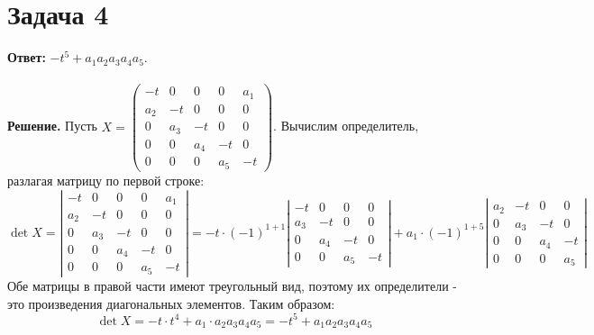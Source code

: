 \documentclass{article}
\begin{document}
\section*{Задача 4}
{\bf Ответ:} $-t^5+a_1a_2a_3a_4a_5$.
\\
\\
{\bf Решение.} Пусть $X=\left(\begin{array}{rrrrr}-t & 0 & 0 & 0 & a_1\\a_2 & -t & 0 & 0 & 0\\0 & a_3 & -t & 0 & 0\\0 & 0 & a_4 & -t & 0\\0 & 0 & 0 & a_5 & -t\end{array}\right)$. Вычислим определитель, разлагая матрицу по первой строке:
$$\det X = \left|\begin{array}{rrrrr}-t & 0 & 0 & 0 & a_1\\a_2 & -t & 0 & 0 & 0\\0 & a_3 & -t & 0 & 0\\0 & 0 & a_4 & -t & 0\\0 & 0 & 0 & a_5 & -t\end{array}\right|=-t\cdot(-1)^{1+1}\left|\begin{array}{rrrr}-t & 0 & 0 & 0\\a_3 & -t & 0 & 0\\0 & a_4 & -t & 0\\0 & 0 & a_5 & -t\end{array}\right| + a_1\cdot(-1)^{1+5}\left|\begin{array}{rrrr}a_2 & -t & 0 & 0\\0 & a_3 & -t & 0\\0 & 0 & a_4 & -t\\0 & 0 & 0 & a_5\end{array}\right|$$
Обе матрицы в правой части имеют треугольный вид, поэтому их определители - это произведения диагональных элементов. Таким образом:
$$\det X = -t \cdot t^4 + a_1 \cdot a_2a_3a_4a_5=-t^5+a_1a_2a_3a_4a_5$$
\end{document}
